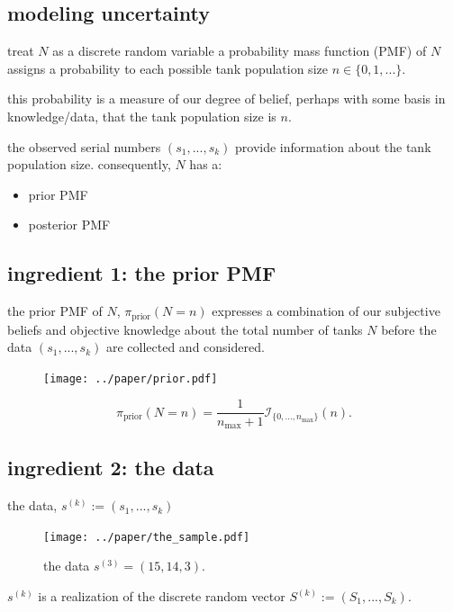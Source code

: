 \documentclass[10pt]{beamer}
\newcommand{\data}{$(s_1, ..., s_k)$\xspace}
\begin{document}
\subsection{modeling uncertainty}

\begin{frame}[t]{treat $N$ as a discrete random variable}
a probability mass function (PMF) of $N$ assigns a probability to each possible tank population size $n\in\{0,1,...\}$. 

\pause 

 this probability is a measure of our degree of belief, perhaps with some basis in knowledge/data, that the tank population size is $n$. 

\pause 

the observed serial numbers \data provide information about the tank population size. consequently, $N$ has a:
\begin{itemize}
	\item prior PMF
	\item posterior PMF
\end{itemize}
\end{frame}

\subsection{ingredient 1: the prior PMF}

\begin{frame}[t]{the prior PMF of $N$, $\pi_{\text{prior}}(N=n)$}
expresses a combination of our subjective beliefs and objective knowledge about the total number of tanks $N$ before the data \data are collected and considered. 

\begin{figure}[h!]
	\centering
	\texttt{[image: ../paper/prior.pdf]}
\end{figure}

\begin{equation*}
	\pi_{\text{prior}}(N=n) = \dfrac{1}{n_{\max}+1} \mathcal{I}_{ \{0, ..., n_{\text{max}}\}}(n).	 
\end{equation*}
\end{frame}

\subsection{ingredient 2: the data}

\begin{frame}[t]{the data, $s^{(k)}:=(s_1,...,s_k)$}
\begin{figure}
	\centering
	\texttt{[image: ../paper/the\_sample.pdf]}
	\caption{the data $s^{(3)}=(15, 14, 3)$.}
\end{figure}

\pause 
{} $s^{(k)}$ is a realization of the discrete random vector $S^{(k)}:=(S_1, ..., S_k)$. 
\end{frame}
\end{document}
